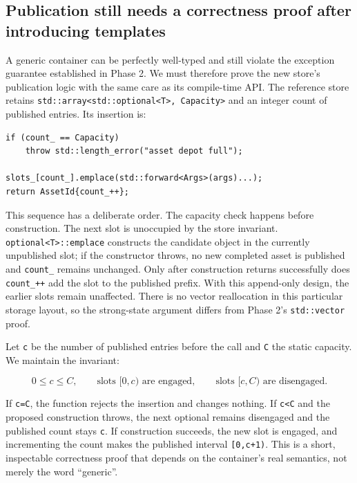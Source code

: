 \subsection{Publication still needs a correctness proof after introducing templates}\label{05-engine-i-ch005-publication-still-needs-a-correctness-proof-after-introducing-templates}

A generic container can be perfectly well-typed and still violate the exception guarantee established in Phase 2. We must therefore prove the new store's publication logic with the same care as its compile-time API. The reference store retains \texttt{std::array\textless{}std::optional\textless{}T\textgreater{},\ Capacity\textgreater{}} and an integer count of published entries. Its insertion is:

\begin{verbatim}
if (count_ == Capacity)
    throw std::length_error("asset depot full");

slots_[count_].emplace(std::forward<Args>(args)...);
return AssetId{count_++};
\end{verbatim}

This sequence has a deliberate order. The capacity check happens before construction. The next slot is unoccupied by the store invariant. \texttt{optional\textless{}T\textgreater{}::emplace} constructs the candidate object in the currently unpublished slot; if the constructor throws, no new completed asset is published and \texttt{count\_} remains unchanged. Only after construction returns successfully does \texttt{count\_++} add the slot to the published prefix. With this append-only design, the earlier slots remain unaffected. There is no vector reallocation in this particular storage layout, so the strong-state argument differs from Phase 2's \texttt{std::vector} proof.

Let \texttt{c} be the number of published entries before the call and \texttt{C} the static capacity. We maintain the invariant:

\[
0\le c\le C,\qquad
\text{slots }[0,c)\text{ are engaged},\qquad
\text{slots }[c,C)\text{ are disengaged}.
\]

If \texttt{c=C}, the function rejects the insertion and changes nothing. If \texttt{c\textless{}C} and the proposed construction throws, the next optional remains disengaged and the published count stays \texttt{c}. If construction succeeds, the new slot is engaged, and incrementing the count makes the published interval \texttt{{[}0,c+1)}. This is a short, inspectable correctness proof that depends on the container's real semantics, not merely the word ``generic''.

